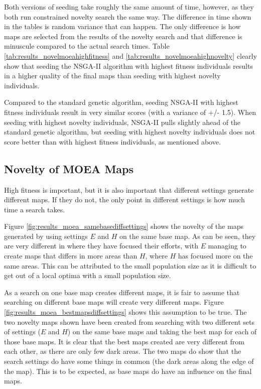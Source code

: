 Both versions of seeding take roughly the same amount of time, however, as they both run constrained novelty search the same way. The difference in time shown in the tables is random variance that can happen. The only difference is how maps are selected from the results of the novelty search and that difference is minuscule compared to the actual search times. Table \ref{tab:results_novelmoeahighfitness} and \ref{tab:results_novelmoeahighnovelty} clearly show that seeding the NSGA-II algorithm with highest fitness individuals results in a higher quality of the final maps than seeding with highest novelty individuals.

Compared to the standard genetic algorithm, seeding NSGA-II with highest fitness individuals result in very similar scores (with a variance of +/- 1.5). When seeding with highest novelty individuals, NSGA-II pulls slightly ahead of the standard genetic algorithm, but seeding with highest novelty individuals does not score better than with highest fitness individuals, as mentioned above.

\subsection*{Novelty of MOEA Maps}

High fitness is important, but it is also important that different settings generate different maps. If they do not, the only point in different settings is how much time a search takes.


Figure \ref{fig:results_moea_samebasediffsettings} shows the novelty of the maps generated by using settings $E$ and $H$ on the same base map. As can be seen, they are very different in where they have focused their efforts, with $E$ managing to create maps that differs in more areas than $H$, where $H$ has focused more on the same areas. This can be attributed to the small population size as it is difficult to get out of a local optima with a small population size.


As a search on one base map creates different maps, it is fair to assume that searching on different base maps will create very different maps. Figure \ref{fig:results_moea_bestmapsdiffsettings} shows this assumption to be true. The two novelty maps shown have been created from searching with two different sets of settings ($E$ and $H$) on the same base maps and taking the best map for each of those base maps. It is clear that the best maps created are very different from each other, as there are only few dark areas. The two maps do show that the search settings do have some things in common (the dark areas along the edge of the map). This is to be expected, as base maps do have an influence on the final maps.